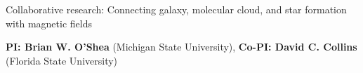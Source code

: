 
\begin{center} 
\begin{LARGE}
Collaborative research: Connecting galaxy, molecular cloud, and star formation with magnetic fields
\end{LARGE}
\end{center}

\pagestyle{plain}
\begin{center}
\textbf{PI: Brian W. O'Shea} (Michigan State University),
\textbf{Co-PI: David C. Collins} (Florida State University)
\end{center}

